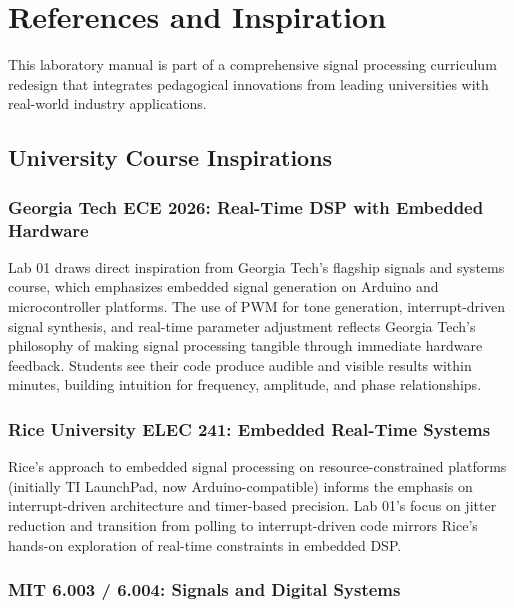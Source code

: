 \documentclass[11pt,letterpaper]{article}
\begin{document}
\clearpage

\section*{References and Inspiration}

This laboratory manual is part of a comprehensive signal processing curriculum redesign that integrates pedagogical innovations from leading universities with real-world industry applications.

\subsection*{University Course Inspirations}

\subsubsection*{Georgia Tech ECE 2026: Real-Time DSP with Embedded Hardware}

Lab 01 draws direct inspiration from Georgia Tech's flagship signals and systems course, which emphasizes embedded signal generation on Arduino and microcontroller platforms. The use of PWM for tone generation, interrupt-driven signal synthesis, and real-time parameter adjustment reflects Georgia Tech's philosophy of making signal processing tangible through immediate hardware feedback. Students see their code produce audible and visible results within minutes, building intuition for frequency, amplitude, and phase relationships.

\subsubsection*{Rice University ELEC 241: Embedded Real-Time Systems}

Rice's approach to embedded signal processing on resource-constrained platforms (initially TI LaunchPad, now Arduino-compatible) informs the emphasis on interrupt-driven architecture and timer-based precision. Lab 01's focus on jitter reduction and transition from polling to interrupt-driven code mirrors Rice's hands-on exploration of real-time constraints in embedded DSP.

\subsubsection*{MIT 6.003 / 6.004: Signals and Digital Systems}
\end{document}
